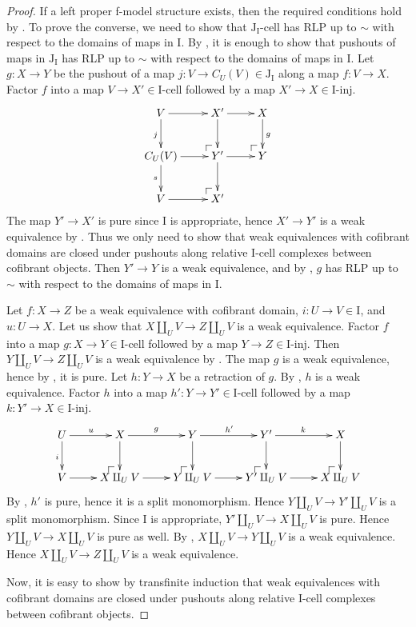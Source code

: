\documentclass{amsart}
\makeatletter
\theoremstyle{definition}
\newcommand{\I}{\mathrm{I}}
\newcommand{\J}{\mathrm{J}}
\newcommand{\class}[2]{#1\text{-}\mathrm{#2}}
\newcommand{\Iinj}[1][\I]{\class{#1}{inj}}
\newcommand{\Icell}[1][\I]{\class{#1}{cell}}
\newcommand{\Jcell}[1][]{\Icell[\J#1]}
\newcommand{\po}[1][dr]{\save*!/#1+1.2pc/#1:(1,-1)@^{|-}\restore}
\makeatother
\begin{document}
\begin{proof}
If a left proper f-model structure exists, then the required conditions hold by .
To prove the converse, we need to show that $\Jcell[_\I]$ has
RLP up to $\sim$ with respect to the domains of maps in $\I$.
By , it is enough to show that pushouts of maps in
$\J_\I$ has RLP up to $\sim$ with respect to the domains of maps in $\I$.
Let $g : X \to Y$ be the pushout of a map $j : V \to C_U(V) \in \J_\I$ along a map $f : V \to X$.
Factor $f$ into a map $V \to X' \in \Icell$ followed by a map $X' \to X \in \Iinj$.
\[ \xymatrix{ V      \ar[r] \ar[d]_j &     X' \ar[r] \ar[d] &     X \ar[d]^g \\
              C_U(V) \ar[r] \ar[d]_s & \po Y' \ar[r] \ar[d] & \po Y \\
              V      \ar[r]          & \po X'
            } \]
The map $Y' \to X'$ is pure since $\I$ is appropriate, hence $X' \to Y'$ is a weak equivalence by .
Thus we only need to show that weak equivalences with cofibrant domains are closed
under pushouts along relative $\I$-cell complexes between cofibrant objects.
Then $Y' \to Y$ is a weak equivalence, and by ,
$g$ has RLP up to $\sim$ with respect to the domains of maps in $\I$.

Let $f : X \to Z$ be a weak equivalence with cofibrant domain, $i : U \to V \in \I$, and $u : U \to X$.
Let us show that $X \amalg_U V \to Z \amalg_U V$ is a weak equivalence.
Factor $f$ into a map $g : X \to Y \in \Icell$ followed by a map $Y \to Z \in \Iinj$.
Then $Y \amalg_U V \to Z \amalg_U V$ is a weak equivalence by .
The map $g$ is a weak equivalence, hence by , it is pure.
Let $h : Y \to X$ be a retraction of $g$.
By , $h$ is a weak equivalence.
Factor $h$ into a map $h' : Y \to Y' \in \Icell$ followed by a map $k : Y' \to X \in \Iinj$.
\[ \xymatrix{ U \ar[d]_i \ar[r]^u &     X \ar[d]     \ar[r]^g &     Y \ar[d]     \ar[r]^{h'} &     Y' \ar[d]     \ar[r]^k &     X \ar[d] \\
              V          \ar[r]   & \po X \amalg_U V \ar[r]   & \po Y \amalg_U V \ar[r]      & \po Y' \amalg_U V \ar[r]   & \po X \amalg_U V
            } \]
By , $h'$ is pure, hence it is a split monomorphism.
Hence $Y \amalg_U V \to Y' \amalg_U V$ is a split monomorphism.
Since $\I$ is appropriate, $Y' \amalg_U V \to X \amalg_U V$ is pure.
Hence $Y \amalg_U V \to X \amalg_U V$ is pure as well.
By , $X \amalg_U V \to Y \amalg_U V$ is a weak equivalence.
Hence $X \amalg_U V \to Z \amalg_U V$ is a weak equivalence.

Now, it is easy to show by transfinite induction that weak equivalences with cofibrant domains are closed
under pushouts along relative $\I$-cell complexes between cofibrant objects.
\end{proof}



\end{document}
